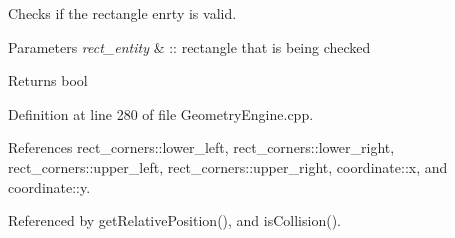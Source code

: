 Checks if the rectangle enrty is valid. 


\begin{DoxyParams}{Parameters}
{\em rect\-\_\-entity} & \-:\-: rectangle that is being checked \\
\hline
\end{DoxyParams}
\begin{DoxyReturn}{Returns}
bool 
\end{DoxyReturn}


Definition at line 280 of file Geometry\-Engine.\-cpp.



References rect\-\_\-corners\-::lower\-\_\-left, rect\-\_\-corners\-::lower\-\_\-right, rect\-\_\-corners\-::upper\-\_\-left, rect\-\_\-corners\-::upper\-\_\-right, coordinate\-::x, and coordinate\-::y.



Referenced by get\-Relative\-Position(), and is\-Collision().


